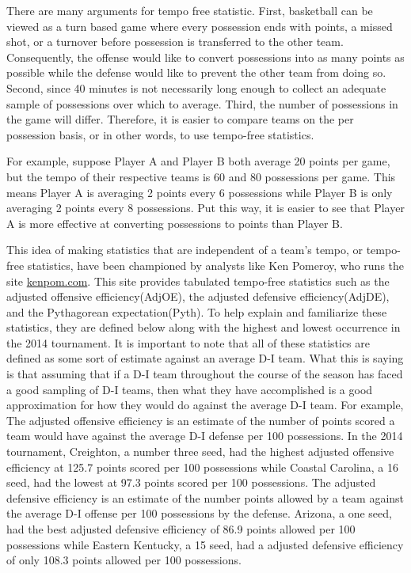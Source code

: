 \documentclass[5p, preprint]{elsarticle}
\begin{document}
There are many arguments for tempo free statistic. First, basketball can be viewed as a turn based game where every possession ends with points, a missed shot, or a turnover before possession is transferred to the other team. Consequently, the offense would like to convert possessions into as many points as possible while the defense would like to prevent the other team from doing so. Second, since 40 minutes is not necessarily long enough to collect an adequate sample of possessions over which to average. Third,  the number of possessions in the game will differ. Therefore,  it is easier to compare teams on the per possession basis, or in other words, to use tempo-free statistics.   

For example, suppose Player A and Player B both average 20 points per game, but the tempo of their respective teams is 60 and 80 possessions per game. This means Player A is averaging 2 points every 6 possessions while Player B is only averaging 2 points every 8 possessions. Put this way, it is easier to see that Player A is more effective at converting possessions to points than Player B.

This idea of making statistics that are independent of a team's tempo, or tempo-free statistics, have been championed by analysts like Ken Pomeroy, who runs the site \url{kenpom.com}. This site provides tabulated tempo-free statistics such as the adjusted offensive efficiency(AdjOE), the adjusted defensive efficiency(AdjDE), and the Pythagorean expectation(Pyth). To help explain and familiarize these statistics, they are defined below along with the highest and lowest occurrence in the 2014 tournament. It is important to note that all of these statistics are defined as some sort of estimate against an average D-I team. What this is saying is that assuming that if a D-I team throughout the course of the season has faced a good sampling of D-I teams, then what they have accomplished is a good approximation for how they would do against the average D-I team. For example, The adjusted offensive efficiency is an estimate of the number of points scored a team would have against the average D-I defense per 100 possessions. In the 2014 tournament, Creighton, a number three seed, had the highest adjusted offensive efficiency at 125.7 points scored per 100 possessions while Coastal Carolina, a 16 seed, had the lowest at 97.3 points scored per 100 possessions. The adjusted defensive efficiency is an estimate of the number points allowed by a team against the average D-I offense per 100 possessions by the defense. Arizona, a one seed, had the best adjusted defensive efficiency of 86.9 points allowed per 100 possessions while Eastern Kentucky, a 15 seed, had a adjusted defensive efficiency of only 108.3 points allowed per 100 possessions. 
\end{document}
